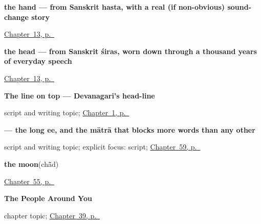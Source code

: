 \noindent\begin{minipage}[t]{\linewidth}
\raggedright
\textbf{the hand — from Sanskrit hasta, with a real (if non-obvious) sound-change story}\enspace\emph{}\par
\footnotesize \hyperref[ch:hi-head-and-hand]{Chapter~13, p.~\pageref*{ch:hi-head-and-hand}}
\end{minipage}\par\smallskip

\noindent\begin{minipage}[t]{\linewidth}
\raggedright
\textbf{the head — from Sanskrit śiras, worn down through a thousand years of everyday speech}\enspace\emph{}\par
\footnotesize \hyperref[ch:hi-head-and-hand]{Chapter~13, p.~\pageref*{ch:hi-head-and-hand}}
\end{minipage}\par\smallskip

\noindent\begin{minipage}[t]{\linewidth}
\raggedright
\textbf{The line on top — Devanagari's head-line}\par
\footnotesize script and writing topic; \hyperref[ch:greetings]{Chapter~1, p.~\pageref*{ch:greetings}}
\end{minipage}\par\smallskip

\noindent\begin{minipage}[t]{\linewidth}
\raggedright
\textbf{ — the long ee, and the mātrā that blocks more words than any other}\par
\footnotesize script and writing topic; explicit focus: script; \hyperref[ch:hi-script-second-wave]{Chapter~59, p.~\pageref*{ch:hi-script-second-wave}}
\end{minipage}\par\smallskip

\noindent\begin{minipage}[t]{\linewidth}
\raggedright
\textbf{the moon}\enspace\emph{}\enspace(chā̃d)\par
\footnotesize \hyperref[ch:hi-the-sky]{Chapter~55, p.~\pageref*{ch:hi-the-sky}}
\end{minipage}\par\smallskip

\noindent\begin{minipage}[t]{\linewidth}
\raggedright
\textbf{The People Around You}\par
\footnotesize chapter topic; \hyperref[ch:hi-people-around-you]{Chapter~39, p.~\pageref*{ch:hi-people-around-you}}
\end{minipage}\par\smallskip

